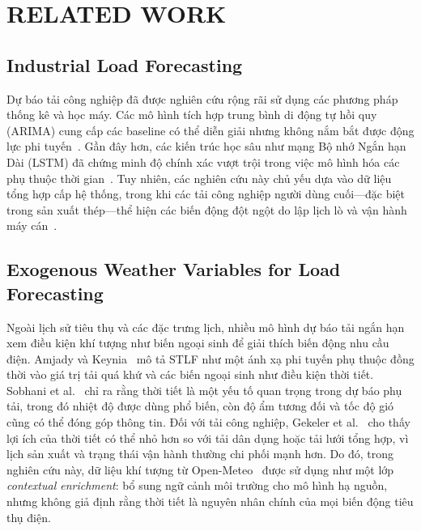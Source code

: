 \section{RELATED WORK}
\label{sec:related}

\subsection{Industrial Load Forecasting}

Dự báo tải công nghiệp đã được nghiên cứu rộng rãi sử dụng các phương pháp thống kê và học máy. Các mô hình tích hợp trung bình di động tự hồi quy (ARIMA) cung cấp các baseline có thể diễn giải nhưng không nắm bắt được động lực phi tuyến~\cite{hippert2001}. Gần đây hơn, các kiến trúc học sâu như mạng Bộ nhớ Ngắn hạn Dài (LSTM) đã chứng minh độ chính xác vượt trội trong việc mô hình hóa các phụ thuộc thời gian~\cite{bouktif2020}. Tuy nhiên, các nghiên cứu này chủ yếu dựa vào dữ liệu tổng hợp cấp hệ thống, trong khi các tải công nghiệp người dùng cuối---đặc biệt trong sản xuất thép---thể hiện các biến động đột ngột do lập lịch lò và vận hành máy cán~\cite{khuntia2016}.

\subsection{Exogenous Weather Variables for Load Forecasting}

Ngoài lịch sử tiêu thụ và các đặc trưng lịch, nhiều mô hình dự báo tải ngắn hạn xem điều kiện khí tượng như biến ngoại sinh để giải thích biến động nhu cầu điện. Amjady và Keynia~\cite{amjady2011} mô tả STLF như một ánh xạ phi tuyến phụ thuộc đồng thời vào giá trị tải quá khứ và các biến ngoại sinh như điều kiện thời tiết. Sobhani et al.~\cite{sobhani2019weather} chỉ ra rằng thời tiết là một yếu tố quan trọng trong dự báo phụ tải, trong đó nhiệt độ được dùng phổ biến, còn độ ẩm tương đối và tốc độ gió cũng có thể đóng góp thông tin. Đối với tải công nghiệp, Gekeler et al.~\cite{gekeler2025weather} cho thấy lợi ích của thời tiết có thể nhỏ hơn so với tải dân dụng hoặc tải lưới tổng hợp, vì lịch sản xuất và trạng thái vận hành thường chi phối mạnh hơn. Do đó, trong nghiên cứu này, dữ liệu khí tượng từ Open-Meteo~\cite{openmeteo2026} được sử dụng như một lớp \textit{contextual enrichment}: bổ sung ngữ cảnh môi trường cho mô hình hạ nguồn, nhưng không giả định rằng thời tiết là nguyên nhân chính của mọi biến động tiêu thụ điện.


